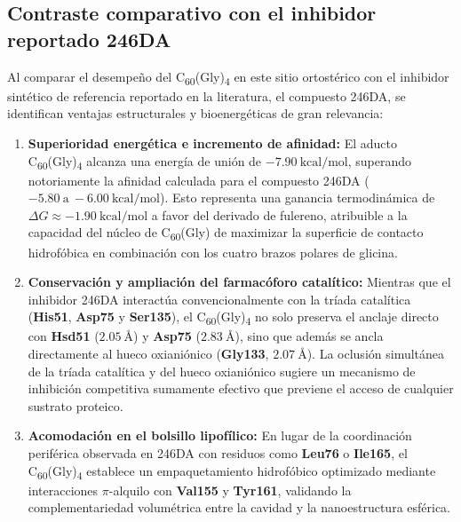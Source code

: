 \begin{table}[htbp]
\subsection{Contraste comparativo con el inhibidor reportado 246DA}

Al comparar el desempeño del C\textsubscript{60}(Gly)\textsubscript{4} en este sitio ortostérico con el inhibidor sintético de referencia reportado en la literatura, el compuesto 246DA, se identifican ventajas estructurales y bioenergéticas de gran relevancia:

\begin{enumerate}
    \item \textbf{Superioridad energética e incremento de afinidad:} El aducto C\textsubscript{60}(Gly)\textsubscript{4} alcanza una energía de unión de $-7.90\ \text{kcal/mol}$, superando notoriamente la afinidad calculada para el compuesto 246DA ($-5.80\ \text{a}\ -6.00\ \text{kcal/mol}$). Esto representa una ganancia termodinámica de $\Delta G \approx -1.90\ \text{kcal/mol}$ a favor del derivado de fulereno, atribuible a la capacidad del núcleo de C\textsubscript{60}(Gly) de maximizar la superficie de contacto hidrofóbica en combinación con los cuatro brazos polares de glicina.
    
    \item \textbf{Conservación y ampliación del farmacóforo catalítico:} Mientras que el inhibidor 246DA interactúa convencionalmente con la tríada catalítica (\textbf{His51}, \textbf{Asp75} y \textbf{Ser135}), el C\textsubscript{60}(Gly)\textsubscript{4} no solo preserva el anclaje directo con \textbf{Hsd51} ($2.05\ \text{\AA}$) y \textbf{Asp75} ($2.83\ \text{\AA}$), sino que además se ancla directamente al hueco oxianiónico (\textbf{Gly133}, $2.07\ \text{\AA}$). La oclusión simultánea de la tríada catalítica y del hueco oxianiónico sugiere un mecanismo de inhibición competitiva sumamente efectivo que previene el acceso de cualquier sustrato proteico.
    
    \item \textbf{Acomodación en el bolsillo lipofílico:} En lugar de la coordinación periférica observada en 246DA con residuos como \textbf{Leu76} o \textbf{Ile165}, el C\textsubscript{60}(Gly)\textsubscript{4} establece un empaquetamiento hidrofóbico optimizado mediante interacciones $\pi$-alquilo con \textbf{Val155} y \textbf{Tyr161}, validando la complementariedad volumétrica entre la cavidad y la nanoestructura esférica.
\end{enumerate}


\end{table}
